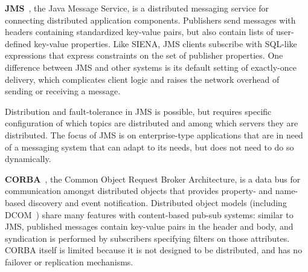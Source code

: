\textbf{JMS}~\cite{hapner2002java}, the Java Message Service, is a distributed messaging service for connecting distributed application components.
Publishers send messages with headers containing standardized key-value pairs, but also contain lists of user-defined key-value properties.
Like SIENA, JMS clients subscribe with SQL-like expressions that express constraints on the set of publisher properties.
One difference between JMS and other systems is its default setting of exactly-once delivery, which complicates client logic and raises the network overhead of sending or receiving a message.

Distribution and fault-tolerance in JMS is possible, but requires specific configuration of which topics are distributed and among which servers they are distributed.
The focus of JMS is on enterprise-type applications that are in need of a messaging system that can adapt to its needs, but does not need to do so dynamically.




\textbf{CORBA}~\cite{vinoski1997corba}, the Common Object Request Broker Architecture, is a data bus for communication amongst distributed objects that provides property- and name-based discovery and event notification.
Distributed object models (including DCOM~\cite{horstmann1997dcom}) share many features with content-based pub-sub systems: similar to JMS, published messages contain key-value pairs in the header and body, and syndication is performed by subscribers specifying filters on those attributes.
CORBA itself is limited because it is not designed to be distributed, and has no failover or replication mechanisms.

